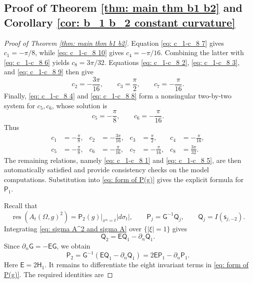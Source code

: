 \documentclass[11pt]{amsart}
\newcommand*{\res}{\operatorname{res}}
\theoremstyle{definition}
\numberwithin{equation}{section}
\begin{document}
\subsection{Proof of  Theorem \ref{thm: main thm b1 b2} and  Corollary \ref{cor: b_1 b_2 constant curvature} }
\begin{proof}[Proof of Theorem \ref{thm: main thm b1 b2}]

Equation \eqref{eq: c_1-c_8 7} gives $c_1=-\pi/8$, while \eqref{eq: c_1-c_8 10} gives $c_4=-\pi/16$.  Combining the latter with \eqref{eq: c_1-c_8 6} yields $c_8=3\pi/32$.  Equations \eqref{eq: c_1-c_8 2}, \eqref{eq: c_1-c_8 3}, and \eqref{eq: c_1-c_8 9} then give
\[
 c_2=-\frac{3\pi}{16},\qquad
 c_3=\frac\pi2,\qquad
 c_7=-\frac\pi{16}.
\]
Finally, \eqref{eq: c_1-c_8 4} and \eqref{eq: c_1-c_8 8} form a nonsingular two-by-two system for $c_5,c_6$, whose solution is
\[
 c_5=-\frac\pi8,\qquad c_6=-\frac\pi{16}.
\]
Thus
\begin{align*}
 c_1&=-\frac\pi8,& c_2&=-\frac{3\pi}{16},& c_3&=\frac\pi2,& c_4&=-\frac\pi{16},\\
 c_5&=-\frac\pi8,& c_6&=-\frac\pi{16},& c_7&=-\frac\pi{16},& c_8&=\frac{3\pi}{32}.
\end{align*}
The remaining relations, namely \eqref{eq: c_1-c_8 1} and \eqref{eq: c_1-c_8 5}, are then automatically satisfied and provide consistency checks on the model computations.  Substitution into \eqref{eq: form of P(g)} gives the explicit formula for $\mathsf P_1$.

Recall that
\[
 \res(A_t(\Omega,g)^2)=\mathsf P_2(g)\big|_{x^n=t}|d\sigma_t|,
 \qquad \mathsf P_j=\mathsf G^{-1}\mathsf Q_j,
 \qquad \mathsf Q_j=I(\mathsf s_{j,-2}).
\]
Integrating \eqref{eq: sigma A^2 and sigma A} over $\{|\xi|=1\}$ gives
\[
 \mathsf Q_2=\mathsf E\mathsf Q_1-\partial_n\mathsf Q_1.
\]
Since $\partial_n\mathsf G=-\mathsf E\mathsf G$, we obtain
\begin{equation}\label{eq: P2 = 2EP1 - dn P1}
 \mathsf P_2
 =\mathsf G^{-1}(\mathsf E\mathsf Q_1-\partial_n\mathsf Q_1)
 =2\mathsf E\mathsf P_1-\partial_n\mathsf P_1.
\end{equation}
Here $\mathsf E=2\mathsf H_1$.  It remains to differentiate the eight invariant terms in \eqref{eq: form of P(g)}.  The required identities are


\end{proof}
\end{document}
